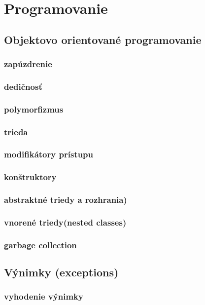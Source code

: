 \chapter[Programovanie]{Programovanie}
\label{programovanie} %

\section{Objektovo orientované programovanie}
\subsection{zapúzdrenie}
\subsection{dedičnosť}
\subsection{polymorfizmus}
\subsection{trieda}
\subsection{modifikátory prístupu}
\subsection{konštruktory}
\subsection{abstraktné triedy a rozhrania)}
\subsection{vnorené triedy(nested classes)}
\subsection{garbage collection}

\section{Výnimky (exceptions)}
\subsection{vyhodenie výnimky}
